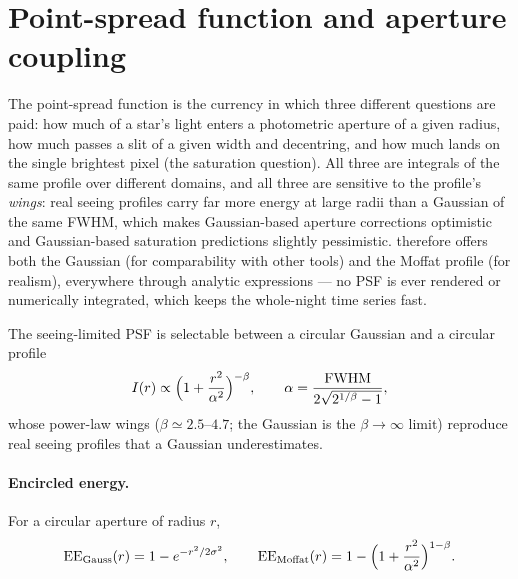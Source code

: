 \section{Point-spread function and aperture coupling}
\label{sec:psf}

The point-spread function is the currency in which three different
questions are paid: how much of a star's light enters a photometric
aperture of a given radius, how much passes a slit of a given width and
decentring, and how much lands on the single brightest pixel (the
saturation question). All three are integrals of the same profile over
different domains, and all three are sensitive to the profile's
\emph{wings}: real seeing profiles carry far more energy at large radii
than a Gaussian of the same FWHM, which makes Gaussian-based aperture
corrections optimistic and Gaussian-based saturation predictions
slightly pessimistic. \spetc{} therefore offers both the Gaussian (for
comparability with other tools) and the Moffat profile (for realism),
everywhere through analytic expressions --- no PSF is ever rendered or
numerically integrated, which keeps the whole-night time series fast.

The seeing-limited PSF is selectable between a circular Gaussian and a
circular \citet{moffat1969} profile
\begin{equation}
  I(r) \propto \Big(1 + \frac{r^2}{\alpha^2}\Big)^{-\beta},
  \qquad
  \alpha = \frac{\rm FWHM}{2\sqrt{2^{1/\beta}-1}},
\end{equation}
whose power-law wings ($\beta \simeq 2.5$--$4.7$; the Gaussian is the
$\beta\to\infty$ limit) reproduce real seeing profiles that a Gaussian
underestimates.

\paragraph{Encircled energy.} For a circular aperture of radius $r$,
\begin{equation}
  \mathrm{EE}_{\rm Gauss}(r) = 1 - e^{-r^2/2\sigma^2},
  \qquad
  \mathrm{EE}_{\rm Moffat}(r) = 1 - \Big(1+\frac{r^2}{\alpha^2}\Big)^{1-\beta}.
\end{equation}

